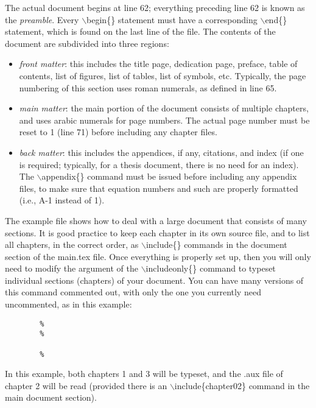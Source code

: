\documentclass[DIV=calc, paper=letter, fontsize=11pt]{scrartcl}	 %
\newcommand{\la}[2]{\textsf{$\backslash$#1}\{#2\}}
\begin{document}
The actual document begins at line 62; everything preceding line 62 is known as the \textit{preamble}.  Every \la{begin}{} statement
must have a corresponding \la{end}{} statement, which is found on the last line of the file.  The contents of the document are 
subdivided into three regions: 
\begin{itemize}
	\item \textit{front matter}: this includes the title page, dedication page, preface, table of contents, list of figures, list of tables, list of
	symbols, etc.  Typically, the page numbering of this section uses roman numerals, as defined in line 65.
	\item \textit{main matter}: the main portion of the document consists of multiple chapters, and uses arabic numerals for page numbers.
	The actual page number must be reset to 1 (line 71) before including any chapter files.
	\item \textit{back matter}: this includes the appendices, if any, citations, and index (if one is required; typically, for a thesis
	document, there is no need for an index).  The \la{appendix}{} command must be issued 
	before including any appendix files, to make sure that equation numbers and such are properly formatted (i.e., A-1 instead of 1).
\end{itemize}
The example file shows how to deal with a large document that consists of many sections.  It is good practice to keep each chapter
in its own source file, and to list all chapters, in the correct order, as \la{include}{} commands in the document section of the \textsf{main.tex} file.
Once everything is properly set up, then you will only need to modify the argument of the \la{includeonly}{} command to typeset individual 
sections (chapters) of your document.  You can have many versions of this command commented out, with only the one you currently 
need uncommented, as in this example:
	\begin{verbatim}
		%
		%
		
		%
	\end{verbatim}
In this example, both chapters 1 and 3 will be typeset, and the .aux file of chapter 2 will be read (provided there is an \la{include}{chapter02}
command in the main document section).
\end{document}
